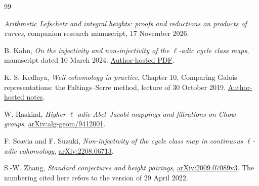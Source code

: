 \documentclass[11pt,a4paper]{article}
\theoremstyle{definition}
\numberwithin{equation}{section}
\begin{document}
\begin{thebibliography}{99}

\emph{Arithmetic Lefschetz and integral heights:
proofs and reductions on products of curves}, companion research
manuscript, 17 November 2026.

B. Kahn, \emph{On the injectivity and non-injectivity of the
\(\ell\)-adic cycle class maps}, manuscript dated 10 March 2024.
\href{https://webusers.imj-prg.fr/~bruno.kahn/preprints/ladic-cycle-class-rev3.pdf}
{Author-hosted PDF}.

K. S. Kedlaya, \emph{Weil cohomology in practice},
Chapter 10, Comparing Galois representations: the Faltings--Serre
method, lecture of 30 October 2019.
\href{https://kskedlaya.org/weil-cohom/chapter-10.html}
{Author-hosted notes}.

W. Raskind, \emph{Higher \(\ell\)-adic Abel--Jacobi mappings and
filtrations on Chow groups},
\href{https://arxiv.org/abs/alg-geom/9412001}{arXiv:alg-geom/9412001}.

F. Scavia and F. Suzuki,
\emph{Non-injectivity of the cycle class map in continuous
\(\ell\)-adic cohomology},
\href{https://arxiv.org/abs/2208.06713}{arXiv:2208.06713}.

S.-W. Zhang, \emph{Standard conjectures and height pairings},
\href{https://arxiv.org/abs/2009.07089v3}{arXiv:2009.07089v3}.
The numbering cited here refers to the version of 29 April 2022.

\end{thebibliography}
\end{document}
